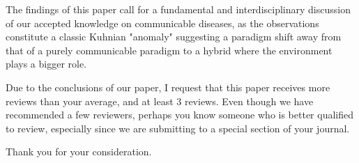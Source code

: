 \documentclass[11pt,a4paper,roman]{moderncv}
\begin{document}
The findings of this paper call for a fundamental and interdisciplinary discussion of our accepted knowledge on communicable diseases, as the observations constitute a classic Kuhnian "anomaly" suggesting a paradigm shift away from that of a purely communicable paradigm to a hybrid where the environment plays a bigger role.

Due to the conclusions of our paper, I request that this paper receives more reviews than your average, and at least 3 reviews. Even though we have recommended a few reviewers, perhaps you know someone who is better qualified to review, especially since we are submitting to a special section of your journal.

Thank you for your consideration.

\makeletterclosing
\newpage


\end{document}
